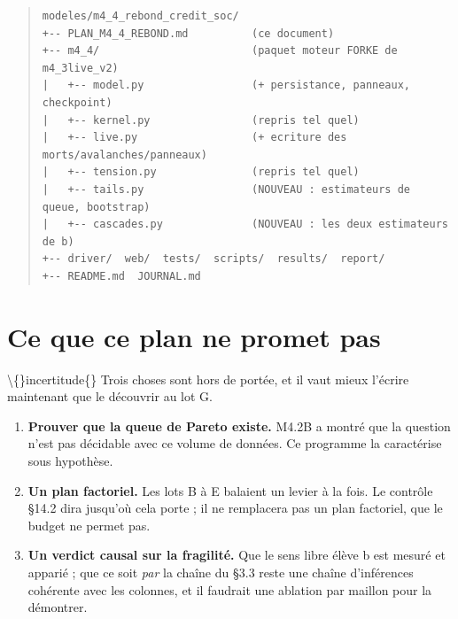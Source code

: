 \documentclass[11pt,a4paper]{article}
\begin{document}
\begin{quote}\footnotesize
\begin{verbatim}
modeles/m4_4_rebond_credit_soc/
+-- PLAN_M4_4_REBOND.md          (ce document)
+-- m4_4/                        (paquet moteur FORKE de m4_3live_v2)
|   +-- model.py                 (+ persistance, panneaux, checkpoint)
|   +-- kernel.py                (repris tel quel)
|   +-- live.py                  (+ ecriture des morts/avalanches/panneaux)
|   +-- tension.py               (repris tel quel)
|   +-- tails.py                 (NOUVEAU : estimateurs de queue, bootstrap)
|   +-- cascades.py              (NOUVEAU : les deux estimateurs de b)
+-- driver/  web/  tests/  scripts/  results/  report/
+-- README.md  JOURNAL.md
\end{verbatim}
\end{quote}

\bigskip

\setcounter{section}{11}
\section{Ce que ce plan ne promet pas}

\textbackslash\{\}incertitude\{\} Trois choses sont hors de portée, et il vaut mieux l'écrire maintenant que le découvrir au lot G.

\begin{enumerate}
\item \textbf{Prouver que la queue de Pareto existe.} M4.2B a montré que la question n'est pas décidable avec ce volume de données. Ce programme la caractérise sous hypothèse.
\item \textbf{Un plan factoriel.} Les lots B à E balaient un levier à la fois. Le contrôle §14.2 dira jusqu'où cela porte ; il ne remplacera pas un plan factoriel, que le budget ne permet pas.
\item \textbf{Un verdict causal sur la fragilité.} Que le sens libre élève b est mesuré et apparié ; que ce soit \emph{par} la chaîne du §3.3 reste une chaîne d'inférences cohérente avec les colonnes, et il faudrait une ablation par maillon pour la démontrer.
\end{enumerate}
\end{document}
